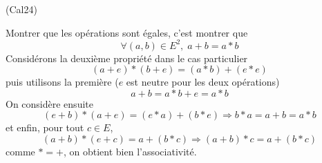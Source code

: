 \begin{tiny}(Cal24)\end{tiny} Montrer que les opérations sont égales, c'est montrer que
\begin{displaymath}
  \forall (a,b)\in E^2, \; a+b = a*b
\end{displaymath}
Considérons la deuxième propriété dans le cas particulier
\begin{displaymath}
  (a + e) * (b +e) = (a*b) + (e*e)
\end{displaymath}
puis utilisons la première ($e$ est neutre pour les deux opérations)
\begin{displaymath}
  a + b = a*b + e = a*b 
\end{displaymath}
On considère ensuite
\begin{displaymath}
  (e + b) * (a + e) = (e*a)+(b*e)\Rightarrow b * a = a + b = a*b
\end{displaymath}
et enfin, pour tout $c\in E$,
\begin{displaymath}
  (a+b)*(e+c) = a + (b*c)\Rightarrow (a+b)*c = a+(b*c)
\end{displaymath}
comme $*=+$, on obtient bien l'associativité.
